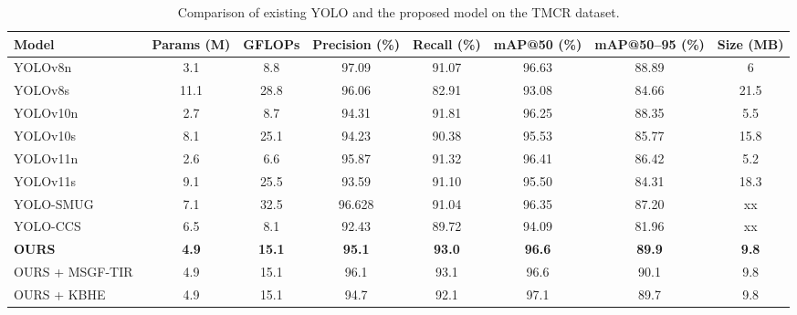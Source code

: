 \documentclass[journal,twoside,web]{ieeecolor}
\begin{document}
\begin{table}[t]
\centering
\caption{Comparison of existing YOLO and the proposed model on the TMCR dataset.}
\label{tab:merged_yolo_comparison}
\begin{tabular}{l c c c c c c c}
\toprule
\textbf{Model} & \textbf{Params (M)} & \textbf{GFLOPs} &
\textbf{Precision (\%)} & \textbf{Recall (\%)} & \textbf{mAP@50 (\%)} &
\textbf{mAP@50--95 (\%)} & \textbf{Size (MB)} \\
\midrule

YOLOv8n  & 3.1  & 8.8  & 97.09 & 91.07 & 96.63 & 88.89 & 6 \\

YOLOv8s  & 11.1  & 28.8  & 96.06 & 82.91 & 93.08 & 84.66 & 21.5 \\

YOLOv10n  & 2.7  & 8.7  & 94.31 & 91.81 & 96.25 & 88.35 & 5.5 \\

YOLOv10s  & 8.1  & 25.1  & 94.23 & 90.38 & 95.53 & 85.77 & 15.8\\

YOLOv11n  & 2.6  & 6.6  & 95.87 & 91.32 & 96.41 & 86.42 & 5.2 \\

YOLOv11s  & 9.1  & 25.5  & 93.59 & 91.10 & 95.50 & 84.31 & 18.3\\

{YOLO-SMUG~\cite{luo2025yolo} }& {7.1 } &{ 32.5} &{ 96.628 }& {91.04} &{96.35} &{ 87.20}& {xx }\\

{YOLO-CCS~\cite{li2024yolo} }  & {6.5 }   &{ 8.1 } & {92.43 }& {89.72 }& {94.09 }&{ 81.96}& {xx }\\
\midrule
\rowcolor{cyan!10}
\textbf{OURS}& \textbf{4.9}  &\textbf{15.1}&\textbf{95.1} & \textbf{93.0} & \textbf{96.6} &  \textbf{89.9} & \textbf{9.8}\\
\rowcolor{cyan!10}
{OURS + MSGF-TIR~\cite{li2024thermal} }& {4.9} &{ 15.1} &{ 96.1}   & {93.1 }  & {96.6 }  &{ 90.1 }& {{9.8}}\\
\rowcolor{cyan!10}
{OURS + KBHE~\cite{mudavath2025person}  }   & {4.9} & {15.1 }&{ 94.7}   & {92.1  } & {97.1 }  & {89.7} & {{9.8}}\\
\bottomrule
\end{tabular}
\end{table}
\end{document}
